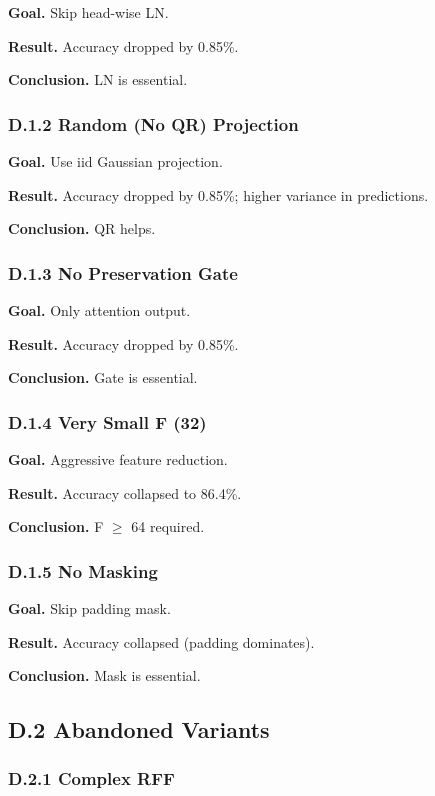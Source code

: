 \textbf{Goal.} Skip head-wise LN.

\textbf{Result.} Accuracy dropped by 0.85\%.

\textbf{Conclusion.} LN is essential.

\subsubsection{D.1.2 Random (No QR) Projection}

\textbf{Goal.} Use iid Gaussian projection.

\textbf{Result.} Accuracy dropped by 0.85\%; higher variance in 
predictions.

\textbf{Conclusion.} QR helps.

\subsubsection{D.1.3 No Preservation Gate}

\textbf{Goal.} Only attention output.

\textbf{Result.} Accuracy dropped by 0.85\%.

\textbf{Conclusion.} Gate is essential.

\subsubsection{D.1.4 Very Small F (32)}

\textbf{Goal.} Aggressive feature reduction.

\textbf{Result.} Accuracy collapsed to 86.4\%.

\textbf{Conclusion.} F $\ge$ 64 required.

\subsubsection{D.1.5 No Masking}

\textbf{Goal.} Skip padding mask.

\textbf{Result.} Accuracy collapsed (padding dominates).

\textbf{Conclusion.} Mask is essential.

\subsection{D.2 Abandoned Variants}

\subsubsection{D.2.1 Complex RFF}

